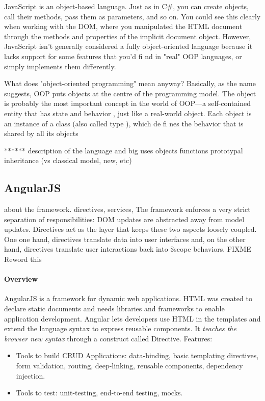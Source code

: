 JavaScript is an
object-based
language. Just as in C#, you can create objects, call their
methods, pass them as parameters, and so on. You could see this clearly when working
with the DOM, where you manipulated the HTML document through the methods
and properties of the implicit
document
object. However, JavaScript isn't generally
considered a fully object-oriented language because it lacks support for some features
that you'd
fi
nd in "real" OOP languages, or simply implements them differently.

 What does "object-oriented programming" mean anyway? Basically, as the name
suggests, OOP puts objects at the centre of the programming model. The
object
is
probably the most important concept in the world of OOP—a self-contained entity
that has
state
and
behavior
, just like a real-world object. Each object is an instance of a
class
(also called
type
), which de
fi
nes the behavior that is shared by all its objects


******
description of the language and big uses
objects
functions
prototypal inheritance (vs classical model, new, etc)


\subsection{AngularJS}
about the framework. directives, services, 
The framework enforces a very strict separation of responsibilities: \ac{DOM} updates are abstracted away from model updates. 
Directives act as the layer that keeps these two aspects loosely coupled.
One one hand, directives translate data into user interfaces and, on the other hand, directives translate user interactions back into \$scope behaviors. FIXME Reword this

\paragraph{Overview} AngularJS is a framework for dynamic web applications.
\ac{HTML} was created to declare static documents and needs libraries and frameworks to enable application development.
Angular lets developers use \ac{HTML} in the templates and extend the language syntax to express reusable components.
It \textit{teaches the browser new syntax} through a construct called Directive.
Features:
\begin{itemize}
    \item Tools to build \ac{CRUD} Applications: data-binding, basic templating directives, form validation, routing, deep-linking, reusable components, dependency injection.
    \item Tools to test: unit-testing, end-to-end testing, mocks.
\end{itemize}

